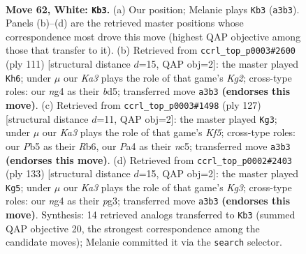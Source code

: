 \documentclass[11pt]{article}
\begin{document}
\clearpage

\begin{figure}[p]\centering
\begin{subfigure}{0.46\textwidth}\centering
\resizebox{\linewidth}{!}{%
\newchessgame
\chessboard[
  setfen={8/3R4/8/1P5k/P5n1/K7/7r/8 w - - 10 62},
  showmover=false,
  pgfstyle=straightmove, color=movearrow, markmove={a3-b3}
]}
\caption{}
\end{subfigure}\hfill
\begin{subfigure}{0.46\textwidth}\centering
\resizebox{\linewidth}{!}{%
\newchessgame
\chessboard[
  setfen={3R4/6k1/3K2p1/3B1p2/7P/8/8/4r3 b - - 14 56},
  showmover=false,
  pgfstyle=straightmove, color=movearrow, markmove={g7-h6}
]}
\caption{}
\end{subfigure}
\\[4pt]
\begin{subfigure}{0.46\textwidth}\centering
\resizebox{\linewidth}{!}{%
\newchessgame
\chessboard[
  setfen={8/8/1r6/2NK4/5kp1/8/3R4/8 b - - 4 64},
  showmover=false,
  pgfstyle=straightmove, color=movearrow, markmove={f4-g3}
]}
\caption{}
\end{subfigure}\hfill
\begin{subfigure}{0.46\textwidth}\centering
\resizebox{\linewidth}{!}{%
\newchessgame
\chessboard[
  setfen={8/8/5pk1/r7/8/6P1/4R2K/8 b - - 7 67},
  showmover=false,
  pgfstyle=straightmove, color=movearrow, markmove={g6-g5}
]}
\caption{}
\end{subfigure}
\caption{\textbf{Move 62, White: \texttt{Kb3}.} (a) Our position; Melanie plays \texttt{Kb3} (\texttt{a3b3}). Panels (b)--(d) are the retrieved master positions whose correspondence most drove this move (highest QAP objective among those that transfer to it). (b) Retrieved from \texttt{ccrl\_top\_p0003\#2600} (ply 111) [structural distance $d$=15, QAP obj=2]: the master played \texttt{Kh6}; under $\mu$ our \emph{Ka3} plays the role of that game's \emph{Kg2}; cross-type roles: our \emph{n}g4 as their \emph{b}d5; transferred move \texttt{a3b3} \textbf{(endorses this move)}. (c) Retrieved from \texttt{ccrl\_top\_p0003\#1498} (ply 127) [structural distance $d$=11, QAP obj=2]: the master played \texttt{Kg3}; under $\mu$ our \emph{Ka3} plays the role of that game's \emph{Kf5}; cross-type roles: our \emph{P}b5 as their \emph{R}b6, our \emph{P}a4 as their \emph{n}c5; transferred move \texttt{a3b3} \textbf{(endorses this move)}. (d) Retrieved from \texttt{ccrl\_top\_p0002\#2403} (ply 133) [structural distance $d$=15, QAP obj=2]: the master played \texttt{Kg5}; under $\mu$ our \emph{Ka3} plays the role of that game's \emph{Kg3}; cross-type roles: our \emph{n}g4 as their \emph{p}g3; transferred move \texttt{a3b3} \textbf{(endorses this move)}. Synthesis: 14 retrieved analogs transferred to \texttt{Kb3} (summed QAP objective 20, the strongest correspondence among the candidate moves); Melanie committed it via the \texttt{search} selector.}
\label{fig:thought-m122}
\end{figure}
\end{document}
